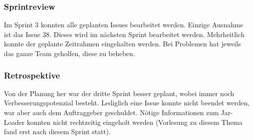 \documentclass[11pt]{article}
\begin{document}
\subsubsection{Sprintreview}
Im Sprint 3 konnten alle geplanten Issues bearbeitet werden. Einzige Ausnahme ist das Issue 38. Dieses wird im nächsten Sprint bearbeitet werden. Mehrheitlich konnte der geplante Zeitrahmen eingehalten werden. Bei Problemen hat jeweils das ganze Team geholfen, diese zu beheben. 
\begin{table}[!h]
\end{table} 

\subsubsection{Retrospektive}
Von der Planung her war der dritte Sprint besser geplant, wobei immer noch Verbesserungspotenzial besteht. Lediglich eine Issue konnte nicht beendet werden, war aber auch dem Auftraggeber  geschuldet. Nötige Informationen zum Jar-Loader konnten nicht rechtzeitig eingeholt werden (Vorlesung zu diesem Thema fand erst nach diesem Sprint statt).
\end{document}
